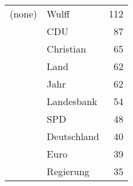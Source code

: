\begin{tabular}{llr}
(none) & Wulff
 & 112 \\
 & CDU
 & 87 \\
 & Christian
 & 65 \\
 & Land
 & 62 \\
 & Jahr
 & 62 \\
 & Landesbank
 & 54 \\
 & SPD
 & 48 \\
 & Deutschland
 & 40 \\
 & Euro
 & 39 \\
 & Regierung
 & 35 \\
\end{tabular}

